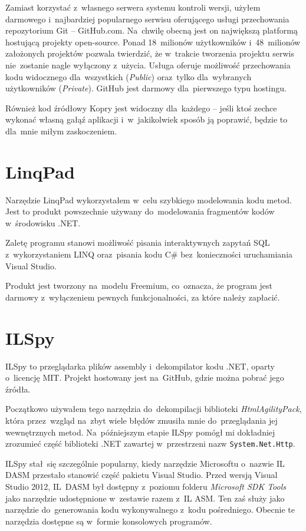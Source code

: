 \documentclass[a4paper,twoside,titlepage,openright]{book}
\begin{document}
Zamiast korzystać z~własnego serwera systemu kontroli wersji, użyłem darmowego i~najbardziej popularnego serwisu oferującego usługi przechowania repozytorium Git -- GitHub.com. Na~chwilę obecną jest on największą platformą hostującą projekty open-source. Ponad 18~milionów użytkowników i~48~milionów założonych projektów pozwala twierdzić, że w~trakcie tworzenia projektu serwis nie~zostanie nagle wyłączony z~użycia. Usługa oferuje możliwość przechowania kodu widocznego dla~wszystkich (\textit{Public}) oraz~tylko dla~wybranych użytkowników (\textit{Private}). GitHub jest darmowy dla~pierwszego typu hostingu.\cite{gutHubCennik} 

Również kod źródłowy Kopry jest widoczny dla~każdego -- jeśli ktoś zechce wykonać własną gałąź aplikacji i~w~jakikolwiek sposób ją poprawić, będzie to dla~mnie miłym zaskoczeniem.


\section{LinqPad}
Narzędzie LinqPad wykorzystałem w~celu szybkiego modelowania kodu metod. Jest to produkt powszechnie używany do~modelowania fragmentów kodów w~środowisku .NET. 

Zaletę programu stanowi możliwość pisania interaktywnych zapytań SQL z~wykorzystaniem LINQ oraz~pisania kodu C\# bez~konieczności uruchamiania Visual Studio.\cite{linqPad} 

Produkt jest tworzony na~modelu Freemium, co~oznacza, że program jest darmowy z~wyłączeniem pewnych funkcjonalności, za które należy zapłacić.\cite{linqPadWiki}



\section{ILSpy}
ILSpy to przeglądarka plików assembly i~dekompilator kodu .NET, oparty o~licencję MIT. Projekt hostowany jest na~GitHub, gdzie można pobrać jego źródła.\cite{ilSpyRepo} 

Początkowo używałem tego narzędzia do~dekompilacji biblioteki \textit{HtmlAgilityPack}, która przez~wzgląd na~zbyt wiele błędów zmusiła mnie do~przeglądania jej wewnętrznych metod. Na~późniejszym etapie ILSpy pomógł mi dokładniej zrozumieć część biblioteki .NET zawartej w~przestrzeni nazw \texttt{System.Net.Http}. 

ILSpy stał~się szczególnie popularny, kiedy narzędzie Microsoftu o~nazwie IL DASM przestało stanowić część pakietu Visual Studio. Przed wersją Visual Studio 2012, IL~DASM był dostępny z~poziomu folderu \textit{Microsoft SDK Tools} jako narzędzie udostępnione w~zestawie razem z~IL ASM. Ten zaś służy jako narzędzie do~generowania kodu wykonywalnego z~kodu pośredniego. Obecnie te narzędzia dostępne są w~formie konsolowych programów. 
\end{document}

